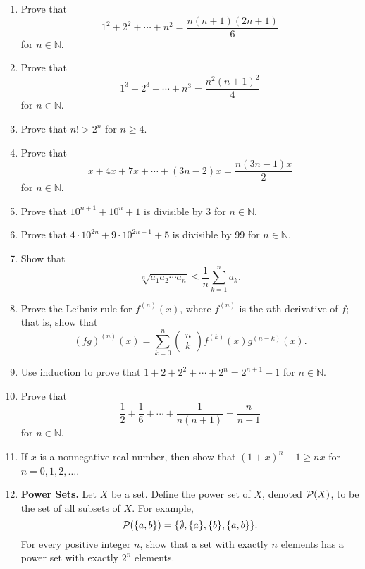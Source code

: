 {\small
 
\begin{enumerate}
 
\item
Prove that
$$
1^2 + 2^2 + \cdots + n^2 = \frac{n(n + 1)(2n + 1)}{6}
$$
for $n \in {\mathbb N}$.

\item
Prove that
$$
1^3 + 2^3 + \cdots + n^3 = \frac{n^2(n + 1)^2}{4}
$$
for $n \in {\mathbb N}$.

\item
Prove that $n! > 2^n$ for $n \geq 4$.

\item
Prove that
$$
x + 4x + 7x + \cdots + (3n-2)x = \frac{n(3n - 1)x}{2}
$$
for $n \in {\mathbb N}$.

\item
Prove that $10^{n + 1} + 10^n + 1$ is divisible by 3 for $n \in {\mathbb N}$.

\item
Prove that $4 \cdot 10^{2n} + 9 \cdot 10^{2n - 1} + 5$ is divisible by 99 for $n \in {\mathbb N}$.

\item
Show that
$$
\sqrt[n]{a_1 a_2 \cdots a_n} \leq \frac{1}{n} \sum_{k = 1}^{n} a_k.
$$

\item
Prove the Leibniz rule for $f^{(n)} (x)$, where $f^{(n)}$ is the $n$th derivative of $f$; that is, show that 
$$
(fg)^{(n)} (x) = \sum_{k=0}^{n}
\left(
\begin{array}{c}
n \\ k
\end{array}
\right)
f^{(k)}(x) g^{(n-k)} (x).
$$

\item
Use induction to prove that $1 + 2 + 2^2 + \cdots + 2^n = 2^{n + 1} - 1$ for $n \in {\mathbb N}$. 

\item 
Prove that
$$
\frac{1}{2}+ \frac{1}{6} + \cdots + \frac{1}{n(n + 1)} = \frac{n}{n + 1} 
$$
for $n \in {\mathbb N}$.

\item 
If $x$ is a nonnegative real number, then show that $(1 + x)^n - 1 \geq nx$ for $n = 0, 1, 2, \ldots$. 
 
\item
{\bf Power Sets.} 
Let $X$ be a set.  Define the {\bfi power set\/} of $X$, denoted ${\cal P}(X)$\label{powerset}, to be the set of all subsets  of $X$.  For example,  
$$
{\cal P}( \{a, b\} ) = \{ \emptyset, \{a\}, \{b\}, \{a, b\} \}.
$$
For every positive integer $n$, show that a set with exactly $n$ elements has a power set with exactly $2^n$ elements.


\end{enumerate}}
